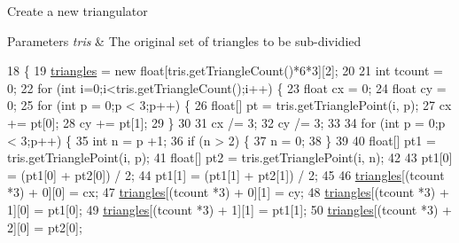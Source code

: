Create a new triangulator


\begin{DoxyParams}{Parameters}
{\em tris} & The original set of triangles to be sub-\/dividied \\
\hline
\end{DoxyParams}

\begin{DoxyCode}
18                                                \{
19         \mbox{\hyperlink{classorg_1_1newdawn_1_1slick_1_1geom_1_1_over_triangulator_a81f4d764fe0327ce4cd6692e777cc5f6}{triangles}} = \textcolor{keyword}{new} \textcolor{keywordtype}{float}[tris.getTriangleCount()*6*3][2];
20         
21         \textcolor{keywordtype}{int} tcount = 0;
22         \textcolor{keywordflow}{for} (\textcolor{keywordtype}{int} i=0;i<tris.getTriangleCount();i++) \{
23             \textcolor{keywordtype}{float} cx = 0;
24             \textcolor{keywordtype}{float} cy = 0;
25             \textcolor{keywordflow}{for} (\textcolor{keywordtype}{int} p = 0;p < 3;p++) \{
26                 \textcolor{keywordtype}{float}[] pt = tris.getTrianglePoint(i, p);
27                 cx += pt[0];
28                 cy += pt[1];
29             \}
30             
31             cx /= 3;
32             cy /= 3;
33             
34             \textcolor{keywordflow}{for} (\textcolor{keywordtype}{int} p = 0;p < 3;p++) \{
35                 \textcolor{keywordtype}{int} n = p +1;
36                 \textcolor{keywordflow}{if} (n > 2) \{
37                     n = 0;
38                 \}
39                 
40                 \textcolor{keywordtype}{float}[] pt1 = tris.getTrianglePoint(i, p);
41                 \textcolor{keywordtype}{float}[] pt2 = tris.getTrianglePoint(i, n);
42 
43                 pt1[0] = (pt1[0] + pt2[0]) / 2;
44                 pt1[1] = (pt1[1] + pt2[1]) / 2;
45                 
46                 \mbox{\hyperlink{classorg_1_1newdawn_1_1slick_1_1geom_1_1_over_triangulator_a81f4d764fe0327ce4cd6692e777cc5f6}{triangles}}[(tcount *3) + 0][0] = cx;
47                 \mbox{\hyperlink{classorg_1_1newdawn_1_1slick_1_1geom_1_1_over_triangulator_a81f4d764fe0327ce4cd6692e777cc5f6}{triangles}}[(tcount *3) + 0][1] = cy;
48                 \mbox{\hyperlink{classorg_1_1newdawn_1_1slick_1_1geom_1_1_over_triangulator_a81f4d764fe0327ce4cd6692e777cc5f6}{triangles}}[(tcount *3) + 1][0] = pt1[0];
49                 \mbox{\hyperlink{classorg_1_1newdawn_1_1slick_1_1geom_1_1_over_triangulator_a81f4d764fe0327ce4cd6692e777cc5f6}{triangles}}[(tcount *3) + 1][1] = pt1[1];
50                 \mbox{\hyperlink{classorg_1_1newdawn_1_1slick_1_1geom_1_1_over_triangulator_a81f4d764fe0327ce4cd6692e777cc5f6}{triangles}}[(tcount *3) + 2][0] = pt2[0];

\end{DoxyCode}
